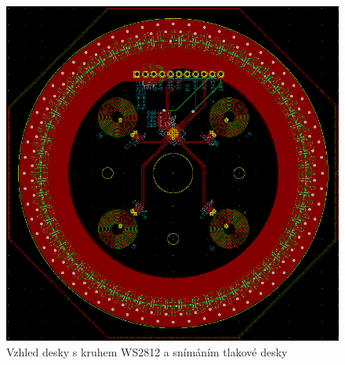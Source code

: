 \begin{figure}
    \centering
    \includegraphics[width=\textwidth]{kapitoly/obrazky/E4/elektronika_tlakove_desky/leddeska-KiCad.png}
    \caption{Vzhled desky s kruhem WS2812 a snímáním tlakové desky}
    \label{fig:E4-LedDeska}
\end{figure}



